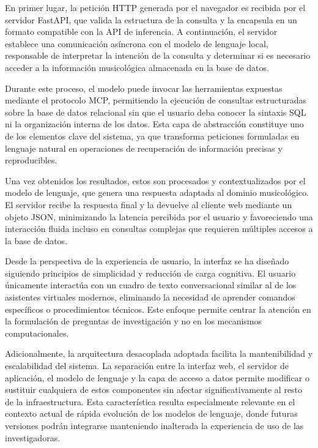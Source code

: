 En primer lugar, la petición HTTP generada por el navegador es recibida por el servidor FastAPI, que valida la estructura de la consulta y la encapsula en un formato compatible con la API de inferencia. A continuación, el servidor establece una comunicación asíncrona con el modelo de lenguaje local, responsable de interpretar la intención de la consulta y determinar si es necesario acceder a la información musicológica almacenada en la base de datos.

Durante este proceso, el modelo puede invocar las herramientas expuestas mediante el protocolo MCP, permitiendo la ejecución de consultas estructuradas sobre la base de datos relacional sin que el usuario deba conocer la sintaxis SQL ni la organización interna de los datos. Esta capa de abstracción constituye uno de los elementos clave del sistema, ya que transforma peticiones formuladas en lenguaje natural en operaciones de recuperación de información precisas y reproducibles.

Una vez obtenidos los resultados, estos son procesados y contextualizados por el modelo de lenguaje, que genera una respuesta adaptada al dominio musicológico. El servidor recibe la respuesta final y la devuelve al cliente web mediante un objeto JSON, minimizando la latencia percibida por el usuario y favoreciendo una interacción fluida incluso en consultas complejas que requieren múltiples accesos a la base de datos.

Desde la perspectiva de la experiencia de usuario, la interfaz se ha diseñado siguiendo principios de simplicidad y reducción de carga cognitiva. El usuario únicamente interactúa con un cuadro de texto conversacional similar al de los asistentes virtuales modernos, eliminando la necesidad de aprender comandos específicos o procedimientos técnicos. Este enfoque permite centrar la atención en la formulación de preguntas de investigación y no en los mecanismos computacionales.

Adicionalmente, la arquitectura desacoplada adoptada facilita la mantenibilidad y escalabilidad del sistema. La separación entre la interfaz web, el servidor de aplicación, el modelo de lenguaje y la capa de acceso a datos permite modificar o sustituir cualquiera de estos componentes sin afectar significativamente al resto de la infraestructura. Esta característica resulta especialmente relevante en el contexto actual de rápida evolución de los modelos de lenguaje, donde futuras versiones podrán integrarse manteniendo inalterada la experiencia de uso de las investigadoras.

